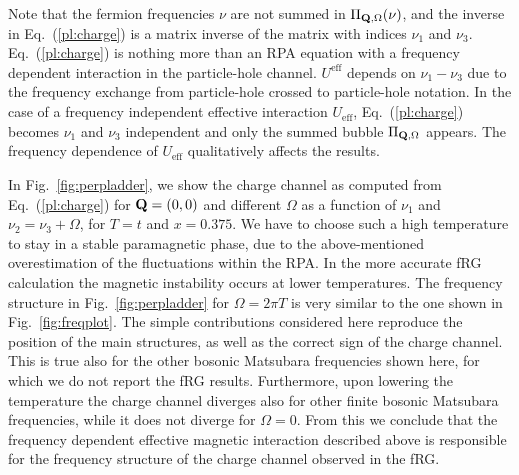 Note that the fermion frequencies $\nu$ are not summed in $\Pi_{\mathbf{Q},\Omega}(\nu)$, and the inverse in Eq.~(\ref{pl:charge}) is a matrix inverse of the matrix with indices $\nu_1$ and $\nu_3$.
Eq.~(\ref{pl:charge}) is nothing more than an RPA equation with a frequency dependent interaction in the particle-hole channel.\cite{Rohringer2012} $U^{\mathrm{eff}}$ depends on $\nu_1-\nu_3$ due to the frequency exchange from particle-hole crossed to particle-hole notation.
In the case of a frequency independent effective interaction $U_{\mathrm{eff}}$, Eq.~(\ref{pl:charge}) becomes $\nu_1$ and $\nu_3$ independent 
and only the summed bubble $\Pi_{\mathbf{Q},\Omega}$ appears.
The frequency dependence of $U_{\mathrm{eff}}$ qualitatively affects the results. 

In Fig.~\ref{fig:perpladder}, we show the charge channel as computed from Eq.~(\ref{pl:charge}) for $\mathbf{Q}=(0,0)$ and different $\Omega$ as a function of $\nu_1$ and $\nu_2 = \nu_3 + \Omega$, for $T=t$ and $x=0.375$.
We have to choose such a high temperature to stay in a stable paramagnetic phase, due to the above-mentioned overestimation of the fluctuations within the RPA. In the more accurate fRG calculation the magnetic instability occurs at lower temperatures.
The frequency structure in Fig.~\ref{fig:perpladder} for $\Omega=2\pi T$ is very similar to the one shown in Fig.~\ref{fig:freqplot}. 
The simple contributions considered here reproduce the position of the main structures, as well as the correct sign of the charge channel. 
This is true also for the other bosonic Matsubara frequencies shown here, for which we do not report the fRG results. 
Furthermore, upon lowering the temperature the charge channel diverges also for other finite bosonic Matsubara frequencies, while it does not diverge for $\Omega=0$.
From this we conclude that the frequency dependent effective magnetic interaction described above is responsible for the frequency structure of the charge channel observed in the fRG. 

